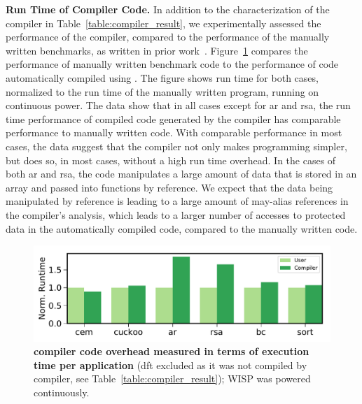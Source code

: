 \textbf{Run Time of \sys Compiler Code.} In addition to the characterization of the \sys compiler in Table~\ref{table:compiler_result}, we experimentally assessed the performance of the \sys compiler, compared to the performance of the manually written benchmarks, as written in prior work~\cite{alpaca,chain}. Figure~\ref{fig:comp_user} compares the performance of manually written benchmark code to the performance of code automatically compiled using \sys. The figure shows run time for both cases, normalized to the run time of the manually written program, running on continuous power. The data show that in all cases except for ar and rsa, the run time performance of compiled code generated by the \sys compiler has comparable performance to manually written code. With comparable performance in most cases, the data suggest that the \sys compiler not only makes programming simpler, but does so, in most cases, without a high run time overhead. In the cases of both ar and rsa, the code manipulates a large amount of data that is stored in an array and passed into functions by reference. We expect that the data being manipulated by reference is leading to a large amount of may-alias references in the compiler's analysis, which leads to a larger number of accesses to protected data in the automatically compiled code, compared to the manually written code.

\begin{figure}
	\centering
	\includegraphics[width=\columnwidth]{figures/comp_user}
	\caption{\textbf{\sys compiler code overhead measured in terms of execution time per application} (dft excluded as it was not compiled by \sys compiler, see Table~\ref{table:compiler_result}); WISP was powered continuously.}
	\label{fig:comp_user}
\end{figure}



